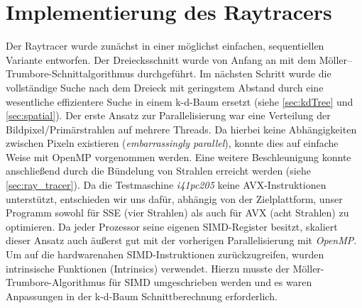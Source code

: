 \section{Implementierung des Raytracers}
Der Raytracer wurde zunächst in einer möglichst einfachen, sequentiellen Variante entworfen. Der Dreiecksschnitt wurde von Anfang an mit dem Möller–Trumbore-Schnitt\-algorithmus durchgeführt. Im nächsten Schritt wurde die vollständige Suche nach dem Dreieck mit geringstem Abstand durch eine wesentliche effizientere Suche in einem k-d-Baum ersetzt (siehe \autoref{sec:kdTree} und \autoref{sec:spatial}). Der erste Ansatz zur Parallelisierung war eine Verteilung der Bildpixel/Primärstrahlen auf mehrere Threads. Da hierbei keine Abhängigkeiten zwischen Pixeln existieren (\textit{embarrassingly parallel}), konnte dies auf einfache Weise mit OpenMP vorgenommen werden.
Eine weitere Beschleunigung konnte anschließend durch die Bündelung von Strahlen erreicht werden (siehe \autoref{sec:ray_tracer}). Da die Testmaschine \textit{i41pc205} keine AVX-Instruktionen unterstützt, entschieden wir uns dafür, abhängig von der Zielplattform, unser Programm sowohl für SSE (vier Strahlen) als auch für AVX (acht Strahlen) zu optimieren. Da jeder Prozessor seine eigenen SIMD-Register besitzt, skaliert dieser Ansatz auch äußerst gut mit der vorherigen Parallelisierung mit \textit{OpenMP}. Um auf die hardwarenahen SIMD-Instruktionen zurückzugreifen, wurden intrinsische Funktionen (Intrinsics) verwendet. Hierzu musste der Möller-Trumbore-Algorithmus für SIMD umgeschrieben werden und es waren Anpassungen in der k-d-Baum Schnittberechnung erforderlich.

